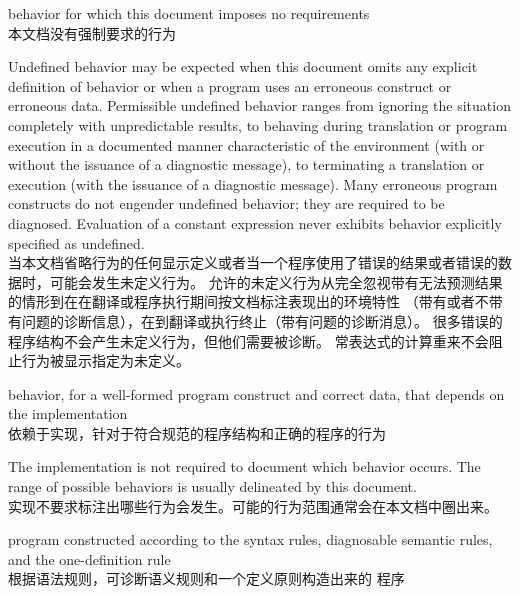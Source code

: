 %
behavior for which this document
imposes no requirements \\
本文档没有强制要求的行为

\begin{defnote}
Undefined behavior may be expected when
this document omits any explicit
definition of behavior or when a program uses an erroneous construct or erroneous data.
Permissible undefined behavior ranges
from ignoring the situation completely with unpredictable results, to
behaving during translation or program execution in a documented manner
characteristic of the environment (with or without the issuance of a
diagnostic message), to terminating a translation or execution (with the
issuance of a diagnostic message). Many erroneous program constructs do
not engender undefined behavior; they are required to be diagnosed.
Evaluation of a constant expression never exhibits behavior explicitly
specified as undefined. \\
当本文档省略行为的任何显示定义或者当一个程序使用了错误的结果或者错误的数据时，可能会发生未定义行为。
允许的未定义行为从完全忽视带有无法预测结果的情形到在在翻译或程序执行期间按文档标注表现出的环境特性
（带有或者不带有问题的诊断信息），在到翻译或执行终止（带有问题的诊断消息）。
很多错误的程序结构不会产生未定义行为，但他们需要被诊断。
常表达式的计算重来不会阻止行为被显示指定为未定义。
\end{defnote}

%
behavior, for a well-formed program construct and correct data, that
depends on the implementation \\
依赖于实现，针对于符合规范的程序结构和正确的程序的行为

\begin{defnote}
The implementation is not required to
document which behavior occurs. The range of
possible behaviors is usually delineated by this document. \\
实现不要求标注出哪些行为会发生。可能的行为范围通常会在本文档中圈出来。
\end{defnote}

%
\Cpp{}  program constructed according to the syntax rules, diagnosable
semantic rules, and the one-definition rule \\
根据语法规则，可诊断语义规则和一个定义原则构造出来的 \Cpp{} 程序

